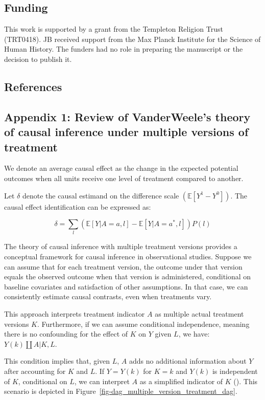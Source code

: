 \documentclass[
  singlecolumn]{article}
\begin{document}
\newpage{}

\subsection{Funding}\label{funding}

This work is supported by a grant from the Templeton Religion Trust
(TRT0418). JB received support from the Max Planck Institute for the
Science of Human History. The funders had no role in preparing the
manuscript or the decision to publish it.

\subsection{References}\label{references}

\newpage{}

\subsection{Appendix 1: Review of VanderWeele's theory of causal
inference under multiple versions of
treatment}\label{appendix-1-review-of-vanderweeles-theory-of-causal-inference-under-multiple-versions-of-treatment}

We denote an average causal effect as the change in the expected
potential outcomes when all units receive one level of treatment
compared to another.

Let \(\delta\) denote the causal estimand on the difference scale
\((\mathbb{E}[Y^1 - Y^0])\). The causal effect identification can be
expressed as:

\[ \delta = \sum_l \left( \mathbb{E}[Y|A=a,l] - \mathbb{E}[Y|A=a^*,l] \right) P(l)\]

The theory of causal inference with multiple treatment versions provides
a conceptual framework for causal inference in observational studies.
Suppose we can assume that for each treatment version, the outcome under
that version equals the observed outcome when that version is
administered, conditional on baseline covariates and satisfaction of
other assumptions. In that case, we can consistently estimate causal
contrasts, even when treatments vary.

This approach interprets treatment indicator \(A\) as multiple actual
treatment versions \(K\). Furthermore, if we can assume conditional
independence, meaning there is no confounding for the effect of \(K\) on
\(Y\) given \(L\), we have: \(Y(k)\coprod A|K,L\).

This condition implies that, given \(L\), \(A\) adds no additional
information about \(Y\) after accounting for \(K\) and \(L\). If
\(Y = Y(k)\) for \(K = k\) and \(Y(k)\) is independent of \(K\),
conditional on \(L\), we can interpret \(A\) as a simplified indicator
of \(K\) ().
This scenario is depicted in
Figure~\ref{fig-dag_multiple_version_treatment_dag}.
\end{document}
